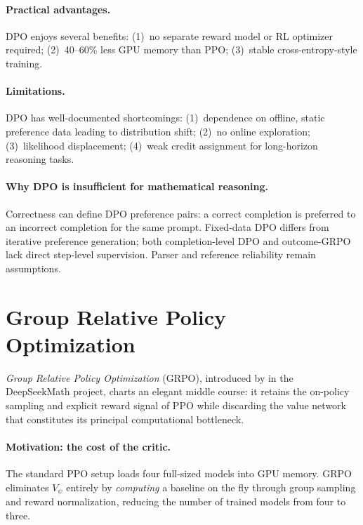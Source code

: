\documentclass[12pt,a4paper]{report}
\begin{document}
\paragraph{Practical advantages.}
DPO enjoys several benefits: (1)~no separate reward model or RL optimizer required; (2)~40--60\% less GPU memory than PPO; (3)~stable cross-entropy-style training.

\paragraph{Limitations.}
DPO has well-documented shortcomings: (1)~dependence on offline, static preference data leading to distribution shift; (2)~no online exploration; (3)~likelihood displacement; (4)~weak credit assignment for long-horizon reasoning tasks.

\paragraph{Why DPO is insufficient for mathematical reasoning.}
Correctness can define DPO preference pairs: a correct completion is preferred to an incorrect completion for the same prompt. Fixed-data DPO differs from iterative preference generation; both completion-level DPO and outcome-GRPO lack direct step-level supervision. Parser and reference reliability remain assumptions.


\section{Group Relative Policy Optimization}
\label{sec:grpo}

\emph{Group Relative Policy Optimization} (GRPO), introduced by \cite{shao2024deepseekmath} in the DeepSeekMath project, charts an elegant middle course: it retains the on-policy sampling and explicit reward signal of PPO while discarding the value network that constitutes its principal computational bottleneck.

\paragraph{Motivation: the cost of the critic.}
The standard PPO setup loads four full-sized models into GPU memory. GRPO eliminates $V_\psi$ entirely by \emph{computing} a baseline on the fly through group sampling and reward normalization, reducing the number of trained models from four to three.
\end{document}
